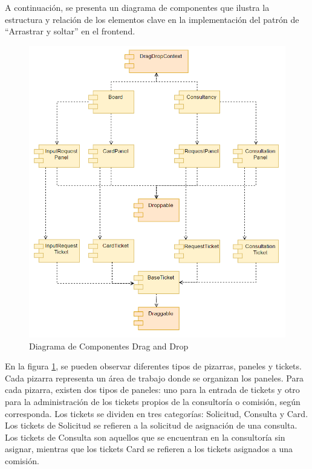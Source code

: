 A continuación, se presenta un diagrama de componentes que ilustra la estructura y relación de los elementos clave en la implementación del patrón de ``Arrastrar y soltar'' en el frontend.

\begin{figure}[H]
\centering
\includegraphics[width=0.90\linewidth]{fig/drag-drop-componentes.png}
\caption{Diagrama de Componentes Drag and Drop}
\label{fig:drag-drop-componentes}
\end{figure}

En la figura \ref{fig:drag-drop-componentes}, se pueden observar diferentes tipos de pizarras, paneles y tickets. Cada pizarra representa un área de trabajo donde se organizan los paneles. Para cada pizarra, existen dos tipos de paneles: uno para la entrada de tickets y otro para la administración de los tickets propios de la consultoría o comisión, según corresponda. Los tickets se dividen en tres categorías: Solicitud, Consulta y Card. Los tickets de Solicitud se refieren a la solicitud de asignación de una consulta. Los tickets de Consulta son aquellos que se encuentran en la consultoría sin asignar, mientras que los tickets Card se refieren a los tickets asignados a una comisión.
